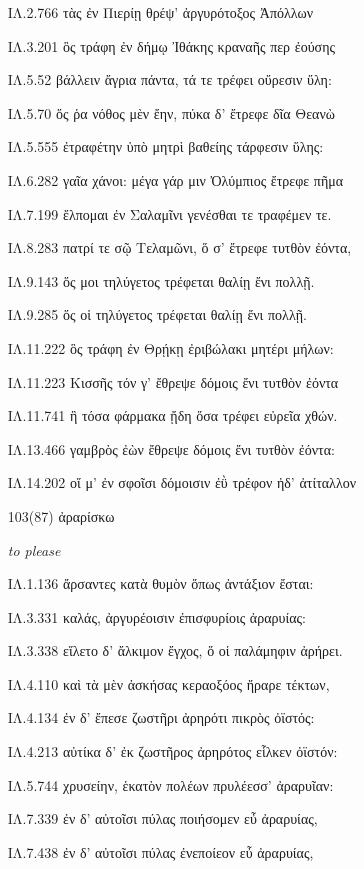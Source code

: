 \begin{enumerate}
{ΙΛ.2.766 τὰς ἐν Πιερίῃ θρέψ' ἀργυρότοξος Ἀπόλλων

ΙΛ.3.201 ὃς τράφη ἐν δήμῳ Ἰθάκης κραναῆς περ ἐούσης

ΙΛ.5.52 βάλλειν ἄγρια πάντα, τά τε τρέφει οὔρεσιν ὕλη:

ΙΛ.5.70 ὅς ῥα νόθος μὲν ἔην, πύκα δ' ἔτρεφε δῖα Θεανὼ

ΙΛ.5.555 ἐτραφέτην ὑπὸ μητρὶ βαθείης τάρφεσιν ὕλης:

ΙΛ.6.282 γαῖα χάνοι: μέγα γάρ μιν Ὀλύμπιος ἔτρεφε πῆμα

ΙΛ.7.199 ἔλπομαι ἐν Σαλαμῖνι γενέσθαι τε τραφέμεν τε.

ΙΛ.8.283 πατρί τε σῷ Τελαμῶνι, ὅ σ' ἔτρεφε τυτθὸν ἐόντα,

ΙΛ.9.143 ὅς μοι τηλύγετος τρέφεται θαλίῃ ἔνι πολλῇ.

ΙΛ.9.285 ὅς οἱ τηλύγετος τρέφεται θαλίῃ ἔνι πολλῇ.

ΙΛ.11.222 ὃς τράφη ἐν Θρῄκῃ ἐριβώλακι μητέρι μήλων:

ΙΛ.11.223 Κισσῆς τόν γ' ἔθρεψε δόμοις ἔνι τυτθὸν ἐόντα

ΙΛ.11.741 ἣ τόσα φάρμακα ᾔδη ὅσα τρέφει εὐρεῖα χθών.

ΙΛ.13.466 γαμβρὸς ἐὼν ἔθρεψε δόμοις ἔνι τυτθὸν ἐόντα:

ΙΛ.14.202 οἵ μ' ἐν σφοῖσι δόμοισιν ἐῢ τρέφον ἠδ' ἀτίταλλον

}

\clearpage
\item[\large 103(87)]{\large \g ἀραρίσκω}

\hspace{0.2cm} \textit{ to please }

{\g
ΙΛ.1.136 ἄρσαντες κατὰ θυμὸν ὅπως ἀντάξιον ἔσται:

ΙΛ.3.331 καλάς, ἀργυρέοισιν ἐπισφυρίοις ἀραρυίας:

ΙΛ.3.338 εἵλετο δ' ἄλκιμον ἔγχος, ὅ οἱ παλάμηφιν ἀρήρει.

ΙΛ.4.110 καὶ τὰ μὲν ἀσκήσας κεραοξόος ἤραρε τέκτων,

ΙΛ.4.134 ἐν δ' ἔπεσε ζωστῆρι ἀρηρότι πικρὸς ὀϊστός:

ΙΛ.4.213 αὐτίκα δ' ἐκ ζωστῆρος ἀρηρότος εἷλκεν ὀϊστόν:

ΙΛ.5.744 χρυσείην, ἑκατὸν πολέων πρυλέεσσ' ἀραρυῖαν:

ΙΛ.7.339 ἐν δ' αὐτοῖσι πύλας ποιήσομεν εὖ ἀραρυίας,

ΙΛ.7.438 ἐν δ' αὐτοῖσι πύλας ἐνεποίεον εὖ ἀραρυίας,

}
\end{enumerate}
